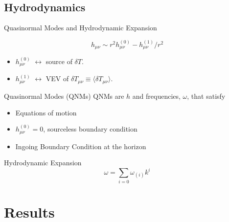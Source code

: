 \documentclass[xcolor=dvipsnames]{beamer}
\begin{document}

\subsection{Hydrodynamics}

\begin{frame}{Quasinormal Modes and Hydrodynamic Expansion}

  \begin{equation*}
    h_{\mu\nu} \sim r^2 h^{\mathrm{(0)}}_{\mu\nu} - h^{\mathrm{(1)}}_{\mu\nu}/r^2
  \end{equation*}

  \begin{itemize}
    \item \(h^{\mathrm{(0)}}_{\mu\nu}\) \(\leftrightarrow\) source of
      \(\delta T\).
    \item \(h^{\mathrm{(1)}}_{\mu\nu}\) \(\leftrightarrow\) VEV of
      \(\delta T_{\mu\nu} \equiv \langle \delta T_{\mu\nu} \rangle\).
  \end{itemize}

  \vfill


  \begin{block}{Quasinormal Modes (QNMs)}
    QNMs are $h$ and frequencies, $\omega$, that satisfy
    \begin{itemize}
      \item Equations of motion
      \item \(h^{\mathrm{(0)}}_{\mu\nu} = 0\), sourceless boundary condition
      \item Ingoing Boundary Condition at the horizon
    \end{itemize}
  \end{block}

  \vfill

  \begin{block}{Hydrodynamic Expansion}
    $$\omega = \sum_{i=0} \omega_{(i)} k^i$$
  \end{block}

\end{frame}


\section{Results}
\end{document}
